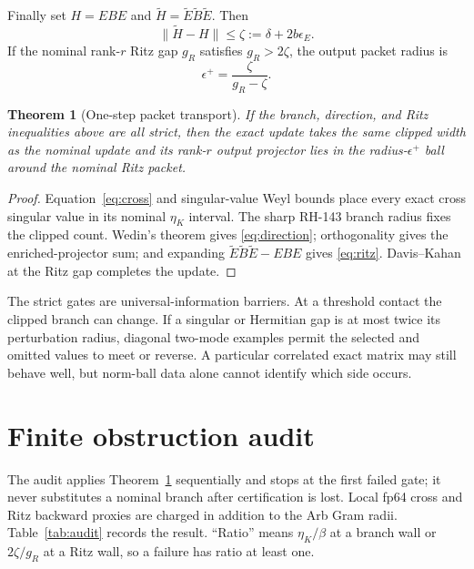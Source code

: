 \documentclass[12pt]{article}
\newtheorem{theorem}{Theorem}
\begin{document}
Finally set $H=EBE$ and $\widetilde H=\widetilde E\widetilde B\widetilde E$.
Then
\begin{equation}\label{eq:ritz}
 \|\widetilde H-H\|\leq
 \zeta:=\delta+2b\epsilon_E.
\end{equation}
If the nominal rank-$r$ Ritz gap $g_R$ satisfies $g_R>2\zeta$, the output
packet radius is
\[
 \epsilon^+=\frac{\zeta}{g_R-\zeta}.
\]

\begin{theorem}[One-step packet transport]\label{thm:transport}
If the branch, direction, and Ritz inequalities above are all strict, then
the exact update takes the same clipped width as the nominal update and its
rank-$r$ output projector lies in the radius-$\epsilon^+$ ball around the
nominal Ritz packet.
\end{theorem}
\begin{proof}
Equation~\eqref{eq:cross} and singular-value Weyl bounds place every exact
cross singular value in its nominal $\eta_K$ interval.  The sharp RH-143
branch radius fixes the clipped count.  Wedin's theorem gives
\eqref{eq:direction}; orthogonality gives the enriched-projector sum; and
expanding $\widetilde E\widetilde B\widetilde E-EBE$ gives
\eqref{eq:ritz}.  Davis--Kahan at the Ritz gap completes the update.
\end{proof}

The strict gates are universal-information barriers.  At a threshold
contact the clipped branch can change.  If a singular or Hermitian gap is at
most twice its perturbation radius, diagonal two-mode examples permit the
selected and omitted values to meet or reverse.  A particular correlated
exact matrix may still behave well, but norm-ball data alone cannot identify
which side occurs.

\section{Finite obstruction audit}
The audit applies Theorem~\ref{thm:transport} sequentially and stops at the
first failed gate; it never substitutes a nominal branch after certification
is lost.  Local fp64 cross and Ritz backward proxies are charged in addition
to the Arb Gram radii.  Table~\ref{tab:audit} records the result.  ``Ratio''
means $\eta_K/\beta$ at a branch wall or $2\zeta/g_R$ at a Ritz wall, so a
failure has ratio at least one.
\end{document}
